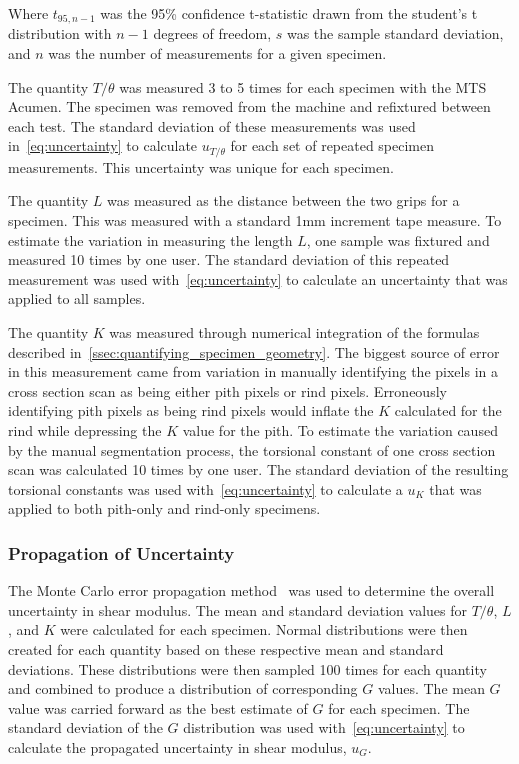 Where ${t_{95,n-1}}$ was the 95\% confidence t-statistic drawn from the student’s t distribution with ${n-1}$ degrees of freedom, ${s}$ was the sample standard deviation, and ${n}$ was the number of measurements for a given specimen.

The quantity ${T/\theta}$ was measured 3 to 5 times for each specimen with the MTS Acumen. The specimen was removed from the machine and refixtured between each test. The standard deviation of these measurements was used in~\cref{eq:uncertainty} to calculate ${u_{T/\theta}}$ for each set of repeated specimen measurements. This uncertainty was unique for each specimen.

The quantity ${L}$ was measured as the distance between the two grips for a specimen. This was measured with a standard 1mm increment tape measure. To estimate the variation in measuring the length ${L}$, one sample was fixtured and measured 10 times by one user. The standard deviation of this repeated measurement was used with~\cref{eq:uncertainty} to calculate an uncertainty that was applied to all samples.

The quantity ${K}$ was measured through numerical integration of the formulas described in~\cref{ssec:quantifying_specimen_geometry}. The biggest source of error in this measurement came from variation in manually identifying the pixels in a cross section scan as being either pith pixels or rind pixels. Erroneously identifying pith pixels as being rind pixels would inflate the ${K}$ calculated for the rind while depressing the ${K}$ value for the pith. To estimate the variation caused by the manual segmentation process, the torsional constant of one cross section scan was calculated 10 times by one user. The standard deviation of the resulting torsional constants was used with~\cref{eq:uncertainty} to calculate a ${u_{K}}$ that was applied to both pith-only and rind-only specimens.

\subsubsection{Propagation of Uncertainty}
\label{ssec:propagation_of_uncertainty}
The Monte Carlo error propagation method~ was used to determine the overall uncertainty in shear modulus. The mean and standard deviation values for ${T/\theta}$, ${L}$, and ${K}$ were calculated for each specimen. Normal distributions were then created for each quantity based on these respective mean and standard deviations. These distributions were then sampled 100 times for each quantity and combined to produce a distribution of corresponding ${G}$ values. The mean ${G}$ value was carried forward as the best estimate of ${G}$ for each specimen. The standard deviation of the ${G}$ distribution was used with~\cref{eq:uncertainty} to calculate the propagated uncertainty in shear modulus, ${u_{G}}$.

